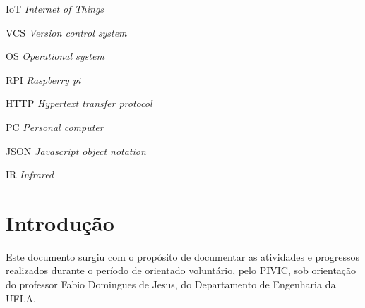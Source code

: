 \documentclass[
12pt,				%
openany,			%
twoside,			%
a4paper,			%
english,			%
french,				%
spanish,			%
brazil,				%
]{abntex2}
\begin{document}
\listoffigures*
\cleardoublepage

\listoftables*
\cleardoublepage

\lstlistoflistings
\cleardoublepage

\begin{siglas}
\item[IoT] \textit{Internet of Things}
\item[VCS] \textit{Version control system}
\item[OS] \textit{Operational system}
\item[RPI] \textit{Raspberry pi}
\item[HTTP] \textit{Hypertext transfer protocol}
\item[PC] \textit{Personal computer}
\item[JSON] \textit{Javascript object notation}
\item[IR] \textit{Infrared}

\end{siglas}


\tableofcontents*
\cleardoublepage


\textual

\chapter*[Introdução]{Introdução}
Este documento surgiu com o propósito de documentar as atividades e progressos
realizados durante o período de orientado voluntário, pelo PIVIC, sob orientação
do professor Fabio Domingues de Jesus, do Departamento de Engenharia da UFLA.
\end{document}
